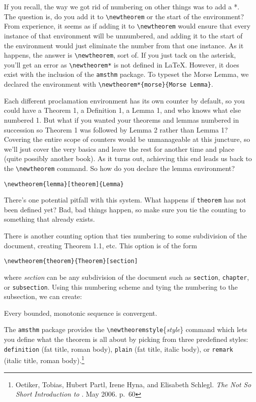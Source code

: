 If you recall, the way we got rid of numbering on other things was to
add a *\@.  The question is, do you add it to \verb|\newtheorem| or
the start of the environment?  From experience, it seems as if adding
it to \verb|\newtheorem| would ensure that every instance of that
environment will be unnumbered, and adding it to the start of the
environment would just eliminate the number from that one instance.
As it happens, the answer is \verb|\newtheorem|, sort of.  If you just
tack on the asterisk, you'll get an error as \verb|\newtheorem*| is
not defined in \LaTeX{}.  However, it does exist with the inclusion of
the \texttt{amsthm} package.  To typeset the Morse Lemma, we declared
the environment with \verb|\newtheorem*{morse}{Morse Lemma}|.

Each different proclamation environment has its own counter by
default, so you could have a Theorem 1, a Definition 1, a Lemma 1, and
who knows what else numbered 1.  But what if you wanted your theorems
and lemmas numbered in succession so Theorem 1 was followed by Lemma 2
rather than Lemma 1?  Covering the entire scope of counters would be
unmanageable at this juncture, so we'll jsut cover the very basics and
leave the rest for another time and place (quite possibly another
book).  As it turns out, achieving this end leads us back to the
\verb|\newtheorem| command.  So how do you declare the lemma
environment?
\begin{verbatim}
\newtheorem{lemma}[theorem]{Lemma}
\end{verbatim}
There's one potential pitfall with this system.  What happens if
\texttt{theorem} has not been defined yet?  Bad, bad things happen, so
make sure you tie the counting to something that already exists.

There is another counting option that ties numbering to some
subdivision of the document, creating Theorem 1.1, etc.  This option
is of the form
\begin{verbatim}
\newtheorem{theorem}{Theorem}[section]
\end{verbatim}
where \emph{section} can be any subdivision of the document such as
\texttt{section}, \texttt{chapter}, or \texttt{subsection}.  Using
this numbering scheme and tying the numbering to the subsection, we
can create:
\begin{thm}
  Every bounded, monotonic sequence is convergent.
\end{thm}

The \texttt{amsthm} package provides the
\verb|\newtheoremstyle|\{\textit{style}\} command which lets you
define what the theorem is all about by picking from three predefined
styles: \texttt{definition} (fat title, roman body), \texttt{plain}
(fat title, italic body), or \texttt{remark} (italic title, roman
body).\footnote{Oetiker, Tobias, Hubert Partl, Irene Hyna, and
  Elisabeth Schlegl.  \emph{The Not So Short Introduction to
    \LaTeXe{}}.  May 2006.  p.\ 60}

